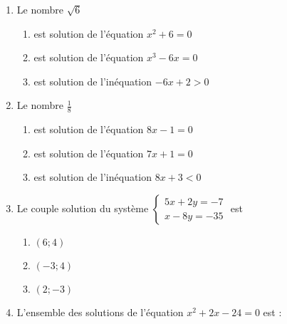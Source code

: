 \documentclass[oneside,twoside]{book}
\begin{document}
\begin{enumerate}
\begin{enumerate}
\end{enumerate}



\item Le nombre $\sqrt{6}$

\begin{enumerate}

\item\MauvaiseReponse est solution de l'équation $x^{2}+6=0$

\item\BonneReponse est solution de l'équation $x^{3}-6x=0$

\item\MauvaiseReponse est solution de l'inéquation $-6x+2>0$

\end{enumerate}

\newpage

\item Le nombre $\frac{1}{8}$

\begin{enumerate}

\item\BonneReponse est solution de l'équation $8x-1=0$
\item\MauvaiseReponse est solution de l'équation $7x+1=0$


\item\MauvaiseReponse est solution de l'inéquation $8x+3<0$

\end{enumerate}



\item Le couple solution du système $\left\{\begin{array}{c}5x+2y=-7 \\ x-8y=-35\end{array}\right.$ est

\begin{enumerate}

\item\MauvaiseReponse $(6;4)$

\item\BonneReponse $(-3 ;4)$
\item\MauvaiseReponse $(2 ; -3)$


\end{enumerate}



\item L'ensemble des solutions de l'équation $x^{2}+2 x-24=0$ est :


\end{enumerate}
\end{document}
